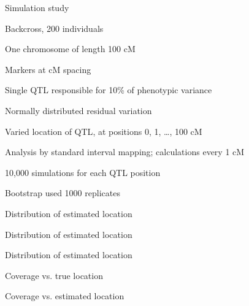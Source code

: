 \documentclass[aspectratio=169,12pt,t]{beamer}
\begin{document}
\begin{frame}{}


\note{
}
\end{frame}



\begin{frame}{Simulation study}


  \vspace*{-5mm}

  \bbi
\item {\hilit Backcross}, 200 individuals

\item One chromosome of length 100 cM

\item Markers at { cM spacing}

\item {\hilit Single QTL} responsible for 10\% of phenotypic variance

\item Normally distributed residual variation

\item {\hilit Varied location of QTL}, at positions 0, 1, \dots, 100 cM

\item Analysis by standard interval mapping;
  calculations every 1 cM

\item 10,000 simulations for each QTL position

\item Bootstrap used 1000 replicates
\ei

\note{
}
\end{frame}


\begin{frame}[c]{Distribution of estimated location}


\note{
}
\end{frame}




\begin{frame}[c]{Distribution of estimated location}


\note{
}
\end{frame}




\begin{frame}[c]{Distribution of estimated location}


\note{
}
\end{frame}



\begin{frame}[c]{Coverage vs. true location}


\note{
}
\end{frame}





\begin{frame}[c]{Coverage vs. estimated location}


\note{
}
\end{frame}
\end{document}
